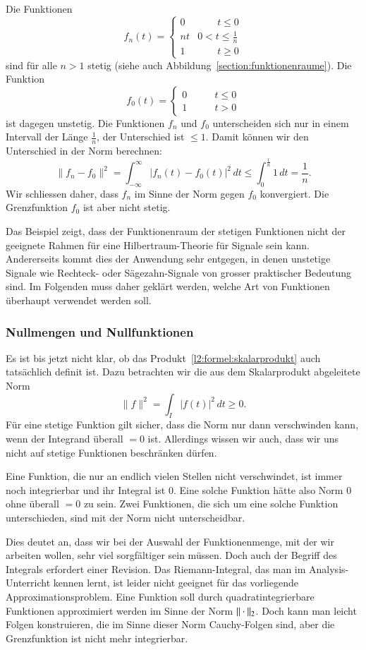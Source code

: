 \begin{beispiel}
Die Funktionen
\[
f_n(t)
=
\begin{cases}
0&\qquad t\le 0\\
nt&0<t\le \frac1n\\
1&\qquad t\ge 0
\end{cases}
\]
sind für alle $n>1$ stetig (siehe auch
Abbildung~\ref{section:funktionenraume}).
Die Funktion
\[
f_0(t) = \begin{cases}
0&\qquad t \le 0\\
1&\qquad t>0
\end{cases}
\]
ist dagegen unstetig.
Die Funktionen $f_n$ und $f_0$ unterscheiden sich nur in einem Intervall
der Länge $\frac1n$, der Unterschied ist $\le 1$.
Damit können wir den Unterschied in der Norm berechnen:
\[
\| f_n - f_0 \|^2
=
\int_{-\infty}^{\infty}
|f_n(t)-f_0(t)|^2
\,dt
\le
\int_0^{\frac1n} 1\,dt
=
\frac1n.
\]
Wir schliessen daher, dass $f_n$ im Sinne der Norm gegen $f_0$ konvergiert.
Die Grenzfunktion $f_0$ ist aber nicht stetig.
\end{beispiel}

Das Beispiel zeigt, dass der Funktionenraum der stetigen Funktionen nicht
der geeignete Rahmen für eine Hilbertraum-Theorie für Signale sein kann.
Andererseits kommt dies der Anwendung sehr entgegen, in denen unstetige
Signale wie Rechteck- oder Sägezahn-Signale von grosser praktischer
Bedeutung sind.
Im Folgenden muss daher geklärt werden, welche Art von Funktionen überhaupt
verwendet werden soll.

\subsubsection{Nullmengen und Nullfunktionen}
Es ist bis jetzt nicht klar, ob das Produkt~\eqref{l2:formel:skalarprodukt}
auch tatsächlich definit ist.
Dazu betrachten wir die aus dem Skalarprodukt abgeleitete Norm
\[
\|f\|^2 = \int_I |f(t)|^2\,dt \ge 0.
\]
Für eine stetige Funktion gilt sicher, dass die Norm nur dann verschwinden
kann, wenn der Integrand überall $=0$ ist.
Allerdings wissen wir auch, dass wir uns nicht auf stetige Funktionen
beschränken dürfen.

Eine Funktion, die nur an endlich vielen Stellen nicht verschwindet,
ist immer noch integrierbar und ihr Integral ist $0$.
Eine solche Funktion hätte also Norm $0$ ohne überall $=0$ zu sein.
Zwei Funktionen, die sich um eine solche Funktion unterschieden, 
sind mit der Norm nicht unterscheidbar.

Dies deutet an, dass wir bei der Auswahl der Funktionenmenge, mit der
wir arbeiten wollen, sehr viel sorgfältiger sein müssen.
Doch auch der Begriff des Integrals erfordert einer Revision.
Das Riemann-Integral, das man im Analysis-Unterricht kennen lernt, 
ist leider nicht geeignet für das vorliegende Approximationsproblem.
Eine Funktion soll durch quadratintegrierbare Funktionen approximiert
werden im Sinne der Norm $\|\mathstrut\cdot\mathstrut\|_2$.
Doch kann man leicht Folgen konstruieren, die im Sinne dieser Norm
Cauchy-Folgen sind, aber die Grenzfunktion ist nicht mehr integrierbar.

